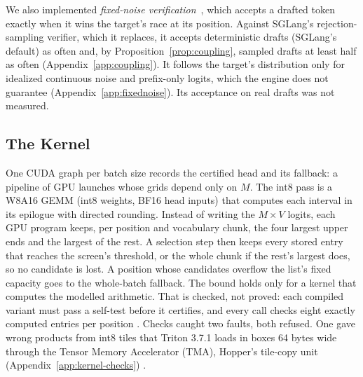 We also implemented \emph{fixed-noise verification}~\cite{daliri2025}, which accepts a drafted token exactly when it wins the target's race at its position. Against SGLang's rejection-sampling verifier, which it replaces, it accepts deterministic drafts (SGLang's default) as often and, by Proposition~\ref{prop:coupling}, sampled drafts at least half as often (Appendix~\ref{app:coupling}). It follows the target's distribution only for idealized continuous noise and prefix-only logits, which the engine does not guarantee (Appendix~\ref{app:fixednoise}). Its acceptance on real drafts was not measured.

\subsection{The Kernel}\label{sec:kernel-design}
One CUDA graph per batch size records the certified head and its fallback: a pipeline of GPU launches whose grids depend only on $M$. The int8 pass is a W8A16 GEMM (int8 weights, BF16 head inputs) that computes each interval in its epilogue with directed rounding. Instead of writing the $M\times V$ logits, each GPU program keeps, per position and vocabulary chunk, the four largest upper ends and the largest of the rest. A selection step then keeps every stored entry that reaches the screen's threshold, or the whole chunk if the rest's largest does, so no candidate is lost. A position whose candidates overflow the list's fixed capacity goes to the whole-batch fallback. The bound holds only for a kernel that computes the modelled arithmetic. That is checked, not proved: each compiled variant must pass a self-test before it certifies, and every call checks eight exactly computed entries per position . Checks caught two faults, both refused. One gave wrong products from int8 tiles that Triton 3.7.1 loads in boxes 64 bytes wide through the Tensor Memory Accelerator (TMA), Hopper's tile-copy unit (Appendix~\ref{app:kernel-checks}) .
